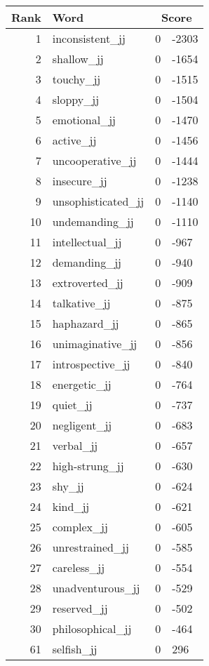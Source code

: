 \begin{longtable}[!htbp]{| rlr@{.}l |}
    \hline
    \textbf{Rank} & \textbf{Word} & \multicolumn{2}{c|}{\textbf{Score}} \\
    \hline
    \endhead
    1 & inconsistent\_jj & 0 & -2303 \\
    2 & shallow\_jj & 0 & -1654 \\
    3 & touchy\_jj & 0 & -1515 \\
    4 & sloppy\_jj & 0 & -1504 \\
    5 & emotional\_jj & 0 & -1470 \\
    6 & active\_jj & 0 & -1456 \\
    7 & uncooperative\_jj & 0 & -1444 \\
    8 & insecure\_jj & 0 & -1238 \\
    9 & unsophisticated\_jj & 0 & -1140 \\
    10 & undemanding\_jj & 0 & -1110 \\
    11 & intellectual\_jj & 0 & -967 \\
    12 & demanding\_jj & 0 & -940 \\
    13 & extroverted\_jj & 0 & -909 \\
    14 & talkative\_jj & 0 & -875 \\
    15 & haphazard\_jj & 0 & -865 \\
    16 & unimaginative\_jj & 0 & -856 \\
    17 & introspective\_jj & 0 & -840 \\
    18 & energetic\_jj & 0 & -764 \\
    19 & quiet\_jj & 0 & -737 \\
    20 & negligent\_jj & 0 & -683 \\
    21 & verbal\_jj & 0 & -657 \\
    22 & high-strung\_jj & 0 & -630 \\
    23 & shy\_jj & 0 & -624 \\
    24 & kind\_jj & 0 & -621 \\
    25 & complex\_jj & 0 & -605 \\
    26 & unrestrained\_jj & 0 & -585 \\
    27 & careless\_jj & 0 & -554 \\
    28 & unadventurous\_jj & 0 & -529 \\
    29 & reserved\_jj & 0 & -502 \\
    30 & philosophical\_jj & 0 & -464 \\
    61 & selfish\_jj & 0 & 296 \\

\end{longtable}
